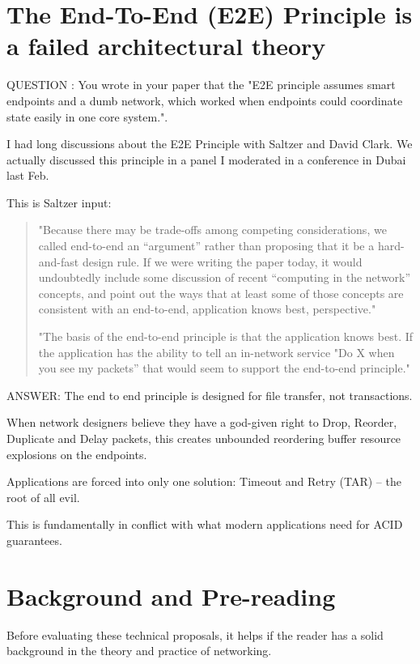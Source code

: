 \documentclass[../HFT-main.tex]{subfiles} %
\begin{document}
\section{The End-To-End (E2E) Principle is a failed architectural theory}

QUESTION : You wrote in your paper that the "E2E principle assumes smart endpoints and a dumb network, which worked when endpoints could coordinate state easily in one core system.".

I had long discussions about the E2E Principle with Saltzer and David Clark. We actually discussed this principle in a panel I moderated in a conference in Dubai last Feb. 

This is Saltzer input:
\begin{quotation}
"Because there may be trade-offs among competing considerations, we called end-to-end an “argument” rather than proposing that it be a hard-and-fast design rule. If we were writing the paper today, it would undoubtedly include some discussion of recent “computing in the network” concepts, and point out the ways that at least some of those concepts are consistent with an end-to-end, application knows best, perspective."

"The basis of the end-to-end principle is that the application knows best.  If the application has the ability to tell an in-network service "Do X when you see my packets” that would seem to support the end-to-end principle."
\end{quotation}


\noindent ANSWER: The end to end principle is designed for file transfer, not transactions. 

When network designers believe they have a god-given right to Drop, Reorder, Duplicate and Delay packets, this creates  unbounded reordering buffer resource explosions on the endpoints.  

Applications are forced into only one solution: Timeout and Retry (TAR) --  the root of all evil.

This is fundamentally in conflict with what modern applications need for ACID guarantees.

\section{Background and Pre-reading}

Before evaluating these technical proposals, it helps if the reader has a solid background in the theory and practice of networking.
\end{document}
